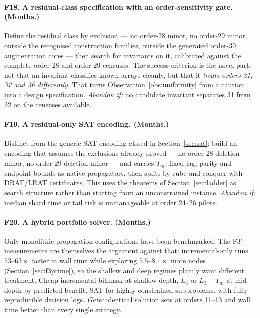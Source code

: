\documentclass[11pt,a4paper]{article}
\theoremstyle{definition}
\begin{document}
\paragraph{F18. A residual-class specification with an order-sensitivity gate.
(Months.)} Define the residual class by exclusion --- no order-28 minor, no
order-29 minor, outside the recognised construction families, outside the
generated order-30 augmentation cores --- then search for invariants on it,
calibrated against the complete order-28 and order-29 censuses. The success
criterion is the novel part: not that an invariant classifies known arrays
cleanly, but that it \emph{treats orders 31, 32 and 36 differently}. That turns
Observation~\ref{obs:uniformity} from a caution into a design specification.
\emph{Abandon if:} no candidate invariant separates 31 from 32 on the censuses
available.

\paragraph{F19. A residual-only SAT encoding. (Months.)}
Distinct from the generic SAT encoding closed in Section~\ref{sec:sat}: build an
encoding that assumes the exclusions already proved --- no order-28 deletion
minor, no order-29 deletion minor --- and carries $T_m$, fixed-lag, parity and
endpoint bounds as native propagators, then splits by cube-and-conquer with
DRAT/LRAT certificates. This uses the theorems of Section~\ref{sec:ladder} as
search structure rather than starting from an unconstrained instance.
\emph{Abandon if:} median shard time or tail risk is unmanageable at order 24--26
pilots.

\paragraph{F20. A hybrid portfolio solver. (Months.)}
Only monolithic propagation configurations have been benchmarked. The F3$'$
measurements are themselves the argument against that: incremental-only runs
$53$--$63\times$ faster in wall time while exploring $5.5$--$8.1\times$ more
nodes (Section~\ref{sec:f3prime}), so the shallow and deep regimes plainly want
different treatment. Cheap incremental bitmask at shallow depth, $L_3$ or
$L_3+T_m$ at mid depth by predicted benefit, SAT for highly constrained
subproblems, with fully reproducible decision logs. \emph{Gate:} identical
solution sets at orders 11--13 and wall time better than every single strategy.
\end{document}
